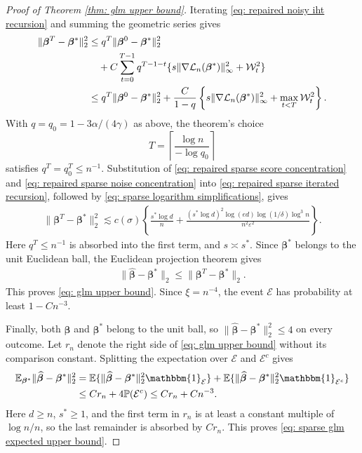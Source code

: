 \documentclass[letterpaper,12pt]{article}
\numberwithin{equation}{section}
\theoremstyle{plain}
\numberwithin{Theorem}{section}
\numberwithin{proposition}{section}
\numberwithin{Lemma}{section}
{
	\theoremstyle{definition}
	\newtheorem{Definition}{Definition}
	\newtheorem{example}{Example}
	\numberwithin{example}{section}
	\newtheorem{fact}{Fact}
	\numberwithin{fact}{section}
	\newtheorem{remark}{Remark}
}
\newcommand{\furtherrev}[1]{#1}
\newcommand{\1}{\mathbbm{1}}
\def\bbeta{{\boldsymbol{\beta}}}
\def\Pr{\mathbb P}
\def\E{\mathbb{E}}
\def\L{{\mathcal L}}
\begin{document}
\begin{proof}[Proof of Theorem \ref{thm: glm upper bound}]
Iterating \eqref{eq: repaired noisy iht recursion} and summing the
geometric series gives
\begin{align}
    \|\bbeta^T-\bbeta^*\|_2^2
    &\leq q^T\|\bbeta^0-\bbeta^*\|_2^2\notag\\
    &\quad+C\sum_{t=0}^{T-1}q^{T-1-t}
    \{s\|\nabla\L_n(\bbeta^*)\|_\infty^2+\mathcal W_t^2\}
    \notag\\
    &\leq q^T\|\bbeta^0-\bbeta^*\|_2^2
    +\frac{C}{1-q}\left\{s\|\nabla\L_n(\bbeta^*)\|_\infty^2
    +\max_{t<T}\mathcal W_t^2\right\}.                    \label{eq: repaired sparse iterated recursion}
\end{align}
\furtherrev{With $q=q_0=1-3\alpha/(4\gamma)$ as above, the theorem's choice
\[
T=\left\lceil\frac{\log n}{-\log q_0}\right\rceil
\]
satisfies $q^T=q_0^T\leq n^{-1}$.}
Substitution of \eqref{eq: repaired sparse score concentration} and
\eqref{eq: repaired sparse noise concentration} into
\eqref{eq: repaired sparse iterated recursion}, followed by
\eqref{eq: sparse logarithm simplifications}, gives
\begin{align*}
\|\bbeta^T-\bbeta^*\|_2^2
\lesssim c(\sigma)\left\{
\frac{s^*\log d}{n}
+\frac{(s^*\log d)^2\log(ed)\log(1/\delta)\log^3n}
{n^2\varepsilon^2}\right\}.
\end{align*}
Here $q^T\leq n^{-1}$ is absorbed into the first term, and
$s\asymp s^*$.  Since $\bbeta^*$ belongs to the unit Euclidean ball,
the Euclidean projection theorem gives
\begin{align*}
\|\widehat\bbeta-\bbeta^*\|_2
\leq\|\bbeta^T-\bbeta^*\|_2.
\end{align*}
	This proves \eqref{eq: glm upper bound}.  Since $\xi=n^{-4}$, the
	event $\mathcal E$ has probability at least $1-Cn^{-3}$.

Finally, both $\widehat\bbeta$ and $\bbeta^*$ belong to the unit ball, so
$\|\widehat\bbeta-\bbeta^*\|_2^2\leq4$ on every outcome.  Let $r_n$
denote the right side of \eqref{eq: glm upper bound} without its
comparison constant.  Splitting the expectation over $\mathcal E$ and
$\mathcal E^c$ gives
\begin{align*}
\E_{\bbeta^*}\|\widehat\bbeta-\bbeta^*\|_2^2
&=\E\{\|\widehat\bbeta-\bbeta^*\|_2^2\1_{\mathcal E}\}
+\E\{\|\widehat\bbeta-\bbeta^*\|_2^2\1_{\mathcal E^c}\}\\
	&\leq Cr_n+4\Pr(\mathcal E^c)
	\leq Cr_n+Cn^{-3}.
	\end{align*}
	Here $d\geq n$, $s^*\geq1$, and the first term in $r_n$ is at least
	a constant multiple of $\log n/n$, so the last remainder is absorbed
	by $Cr_n$.  This proves \eqref{eq: sparse glm expected upper bound}.
\end{proof}
\end{document}
